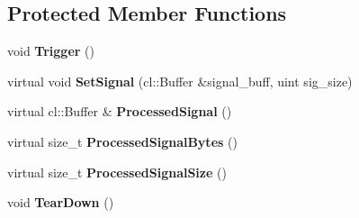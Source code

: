 \subsection*{Protected Member Functions}
\begin{DoxyCompactItemize}
\item 
void {\bfseries Trigger} ()\hypertarget{classjaspl_1_1ocl_1_1_f_f_t_a102a4328d7a30cc8ca8d08c907111fb2}{}\label{classjaspl_1_1ocl_1_1_f_f_t_a102a4328d7a30cc8ca8d08c907111fb2}

\item 
virtual void {\bfseries Set\+Signal} (cl\+::\+Buffer \&signal\+\_\+buff, uint sig\+\_\+size)\hypertarget{classjaspl_1_1ocl_1_1_f_f_t_ab38bdc5c38a82feaddb370f965295efd}{}\label{classjaspl_1_1ocl_1_1_f_f_t_ab38bdc5c38a82feaddb370f965295efd}

\item 
virtual cl\+::\+Buffer \& {\bfseries Processed\+Signal} ()\hypertarget{classjaspl_1_1ocl_1_1_f_f_t_aa03127efd639a389ec6869cc77fed978}{}\label{classjaspl_1_1ocl_1_1_f_f_t_aa03127efd639a389ec6869cc77fed978}

\item 
virtual size\+\_\+t {\bfseries Processed\+Signal\+Bytes} ()\hypertarget{classjaspl_1_1ocl_1_1_f_f_t_ad81ffbffde684b7d2cc68ee7b0c18e67}{}\label{classjaspl_1_1ocl_1_1_f_f_t_ad81ffbffde684b7d2cc68ee7b0c18e67}

\item 
virtual size\+\_\+t {\bfseries Processed\+Signal\+Size} ()\hypertarget{classjaspl_1_1ocl_1_1_f_f_t_a2243fd0a1e2496d51fc0b19f4b451c2d}{}\label{classjaspl_1_1ocl_1_1_f_f_t_a2243fd0a1e2496d51fc0b19f4b451c2d}

\item 
void {\bfseries Tear\+Down} ()\hypertarget{classjaspl_1_1ocl_1_1_f_f_t_a6ad6e55ce5ca1ce4ecb280879994359a}{}\label{classjaspl_1_1ocl_1_1_f_f_t_a6ad6e55ce5ca1ce4ecb280879994359a}

\end{DoxyCompactItemize}
